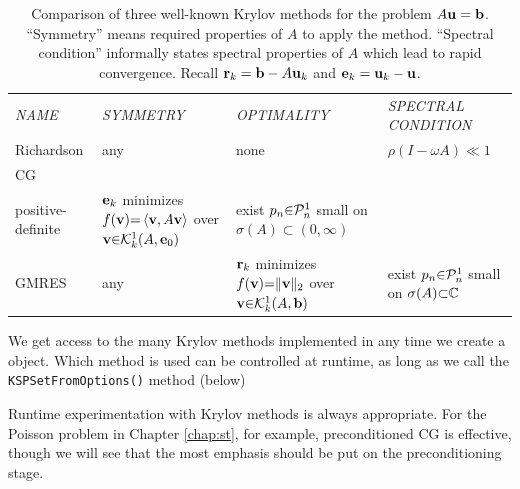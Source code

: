 \newcommand{\mpwide}{27mm}
\begin{table}[h]
\small
\begin{tabular}{llll} \vspace{5mm}
\emph{NAME} & \emph{SYMMETRY} & \emph{OPTIMALITY} & \begin{minipage}[l]{21mm}\emph{SPECTRAL} \emph{CONDITION}\end{minipage} \\ \vspace{5mm}
Richardson & any & none & $\rho(I-\omega A) \ll 1$ \\ \vspace{5mm}
CG & \begin{minipage}[l]{\mpwide}symmetric \\ positive-definite\end{minipage} & \begin{minipage}[l]{25mm}$\mathbf{e}_k$ minimizes $f(\mathbf{v}){=}\left<\mathbf{v},A\mathbf{v}\right>$ over $\mathbf{v}{\in}\mathcal{K}_{k}^1(A,\mathbf{e}_0)$\end{minipage} & \begin{minipage}[l]{\mpwide}exist $p_n{\in}\mathcal{P}_n^1$ small on $\sigma(A){\subset}(0,\infty)$\end{minipage} \\ \vspace{5mm}
GMRES & any & \begin{minipage}[l]{\mpwide}$\mathbf{r}_k$ minimizes $f(\mathbf{v}){=}\|\mathbf{v}\|_2$ over $\mathbf{v}{\in}\mathcal{K}_{k}^1(A,\mathbf{b})$\end{minipage} & \begin{minipage}[l]{\mpwide}exist $p_n{\in}\mathcal{P}_n^1$ small on $\sigma(A){\subset}\mathbb{C}$\end{minipage}
\end{tabular}
\caption{Comparison of three well-known Krylov methods for the problem $A\mathbf{u}=\mathbf{b}$.  ``Symmetry'' means required properties of $A$ to apply the method.  ``Spectral condition'' informally states spectral properties of $A$ which lead to rapid convergence.  Recall $\mathbf{r}_k=\mathbf{b}-A\mathbf{u}_k$ and $\mathbf{e}_k=\mathbf{u}_k-\mathbf{u}$.} \label{tab:krylovcompare}
\end{table}

We get access to the many Krylov methods implemented in \PETSc any time we create a \pKSP object.  Which method is used can be controlled at runtime, as long as we call the \texttt{KSPSetFromOptions()} method (below)

Runtime experimentation with Krylov methods is always appropriate.  For the Poisson problem in Chapter \ref{chap:st}, for example, preconditioned CG is effective, though we will see that the most emphasis should be put on the preconditioning stage.

